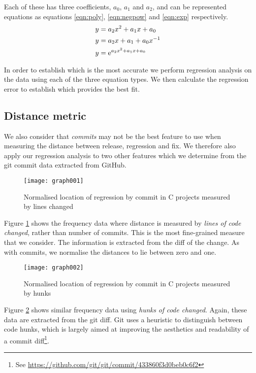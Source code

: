 \documentclass[10pt,journal,compsoc]{IEEEtran}
\begin{document}
Each of these has three coefficients, $a_0$, $a_1$ and $a_2$, and can be represented equations as equations \ref{eqn:poly}, \ref{eqn:negpow} and \ref{eqn:exp} respectively.
\begin{align}
y &= a_2 x^2 + a_1 x + a_0 \label{eqn:poly} \\
y &= a_2 x + a_1 + a_0 x^{-1} \label{eqn:negpow} \\
y &= \e{a_2 x^2 + a_1 x + a_0} \label{eqn:exp}
\end{align}

In order to establish which is the most accurate we perform regression analysis on the data using each of the three equation types. We then calculate the regression error to establish which provides the best fit.

\subsection{Distance metric}

We also consider that {\it commits\/} may not be the best feature to use when measuring the distance between release, regression and fix. We therefore also apply our regression analysis to two other features which we determine from the git commit data extracted from GitHub.

\begin{figure}[t]
\centering
\texttt{[image: graph001]}%
\caption{\label{fig:c-lines}Normalised location of regression by commit in C projects measured by lines changed}
\end{figure}

Figure \ref{fig:c-lines} shows the frequency data where distance is measured by {\it lines of code changed}, rather than number of commits. This is the most fine-grained measure that we consider. The information is extracted from the diff of the change. As with commits, we normalise the distances to lie between zero and one.

\begin{figure}[t]
\centering
\texttt{[image: graph002]}%
\caption{\label{fig:c-blocks}Normalised location of regression by commit in C projects measured by hunks}
\end{figure}

Figure \ref{fig:c-blocks} shows similar frequency data using {\it hunks of code changed}. Again, these data are extracted from the git diff. Git uses a heuristic to distinguish between code hunks, which is largely aimed at improving the aesthetics and readability of a commit diff\footnote{See \url{https://github.com/git/git/commit/433860f3d0beb0c6f2}}.
\end{document}
